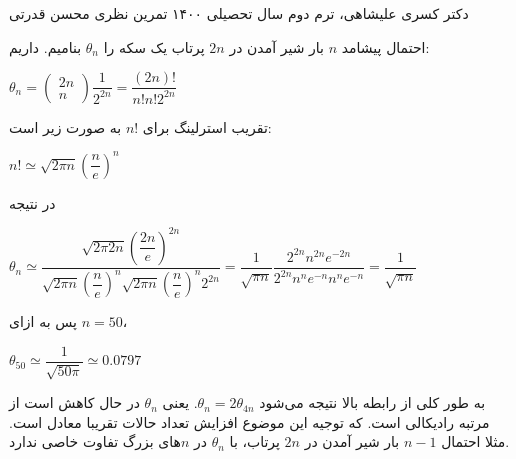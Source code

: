 \documentclass{scribe-cgenomics}
\begin{document}
{دکتر کسری علیشاهی، ترم دوم سال تحصیلی ۱۴۰۰}
{تمرین نظری}
{محسن قدرتی}


\newpage
\begin{prob}

\end{prob}

\begin{حل}
 احتمال پیشامد
$n$
بار شیر آمدن در
$2n$
پرتاب یک سکه را
$\theta_n$
بنامیم. داریم:

\begin{center}
$
\theta_n =
\begin{pmatrix}
2n \\ n
\end{pmatrix}
\dfrac{1}{2^{2n}}
= \dfrac{(2n)!}{n!n!2^{2n}}
$
\end{center}

تقریب استرلینگ برای
$n!$
به صورت زیر است:

\begin{center}
$
n! \simeq \sqrt{2\pi n}(\dfrac{n}{e})^{n}
$
\end{center}

در نتیجه

\begin{center}
$
\theta_n \simeq 
\dfrac{\sqrt{2\pi 2n}(\dfrac{2n}{e})^{2n}}{\sqrt{2\pi n}(\dfrac{n}{e})^n \sqrt{2\pi n}(\dfrac{n}{e})^n 2^{2n}}
= \dfrac{1}{\sqrt{\pi n}} \dfrac{2^{2n}n^{2n}e^{-2n}}{2^{2n} n^n e^{-n}n^n e^{-n}}
= \dfrac{1}{\sqrt{\pi n}}
$
\end{center}

پس به ازای
$n=50$،

\begin{center}
$
\theta_{50} \simeq \dfrac{1}{\sqrt{50\pi}} \simeq 0.0797
$
\end{center}

به طور کلی از رابطه بالا نتیجه می‌شود
$\theta_n = 2\theta_{4n}$.
یعنی
$\theta_n$
در حال کاهش است از مرتبه رادیکالی است. که توجیه این موضوع افزایش تعداد حالات تقریبا معادل است. مثلا احتمال
$n-1$
بار شیر آمدن در
$2n$
پرتاب، با
$\theta_n$
در
$n$های
بزرگ تفاوت خاصی ندارد.

\end{حل}



\newpage
\begin{prob}

\end{prob}
\end{document}
